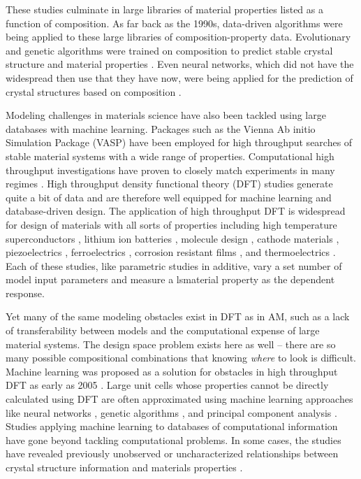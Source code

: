 These studies culminate in large libraries of material properties listed as a function of composition. As far back as the 1990s, data-driven algorithms were being applied to these large libraries of composition-property data. Evolutionary and genetic algorithms were trained on composition to predict stable crystal structure and material properties \cite{Deaven1995, Morris1996, Woodley1999, Stucke2003, Wolf2000}. Even neural networks, which did not have the widespread then use that they have now, were being applied for the prediction of crystal structures based on composition \cite{Sumpter1996}. 

Modeling challenges in materials science have also been tackled using large databases with machine learning. Packages such as the Vienna Ab initio Simulation Package (VASP) have been employed for high throughput searches of stable material systems with a wide range of properties. Computational high throughput investigations have proven to closely match experiments in many regimes \cite{Curtarolo2005}. 
High throughput density functional theory (DFT) studies generate quite a bit of data and are therefore well equipped for machine learning and database-driven design. The application of high throughput DFT is widespread for design of materials with all sorts of properties including high temperature superconductors \cite{Kolmogorov2006}, lithium ion batteries \cite{Kang2006, Chen2012, Kirklin2013}, molecule design \cite{Mannodi-Kanakkithodi2016, Butler2018}, cathode materials \cite{Hautier2013}, piezoelectrics \cite{Roy2012}, ferroelectrics \cite{Bennett2012}, corrosion resistant films \cite{Ciobanu2005}, and thermoelectrics \cite{Wang2011, Yan2015}. Each of these studies, like parametric studies in additive, vary a set number of model input parameters and measure a lsmaterial property as the dependent response.

Yet many of the same modeling obstacles exist in DFT as in AM, such as a lack of transferability between models and the computational expense of large material systems. The design space problem exists here as well -- there are so many possible compositional combinations that knowing \textit{where} to look is difficult. Machine learning was proposed as a solution for obstacles in high throughput DFT as early as 2005 \cite{Morgan2005}.  Large unit cells whose properties cannot be directly calculated using DFT are often approximated using machine learning approaches like neural networks \cite{Behler2015}, genetic algorithms \cite{Hart2005}, and principal component analysis \cite{Snyder2012}. Studies applying machine learning to databases of computational information have gone beyond tackling computational problems. In some cases, the studies have revealed previously unobserved or uncharacterized relationships between crystal structure information and materials properties \cite{Ghiringhelli2015}. 

